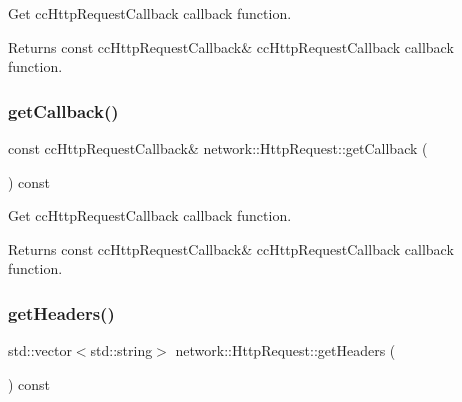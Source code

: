 Get cc\+Http\+Request\+Callback callback function.

\begin{DoxyReturn}{Returns}
const cc\+Http\+Request\+Callback\& cc\+Http\+Request\+Callback callback function. 
\end{DoxyReturn}
\mbox{\label{classnetwork_1_1HttpRequest_abc46429ca35e9585ddb0a96a744ecee2}} 
\subsubsection{\texorpdfstring{get\+Callback()}{getCallback()}\hspace{0.1cm}{\footnotesize\ttfamily [2/2]}}
{\footnotesize\ttfamily const cc\+Http\+Request\+Callback\& network\+::\+Http\+Request\+::get\+Callback (\begin{DoxyParamCaption}{ }\end{DoxyParamCaption}) const\hspace{0.3cm}{\ttfamily [inline]}}

Get cc\+Http\+Request\+Callback callback function.

\begin{DoxyReturn}{Returns}
const cc\+Http\+Request\+Callback\& cc\+Http\+Request\+Callback callback function. 
\end{DoxyReturn}
\mbox{\label{classnetwork_1_1HttpRequest_a3555ebc2bb79d38bf80a36ab9d979e6a}} 
\subsubsection{\texorpdfstring{get\+Headers()}{getHeaders()}\hspace{0.1cm}{\footnotesize\ttfamily [1/2]}}
{\footnotesize\ttfamily std\+::vector$<$std\+::string$>$ network\+::\+Http\+Request\+::get\+Headers (\begin{DoxyParamCaption}{ }\end{DoxyParamCaption}) const\hspace{0.3cm}{\ttfamily [inline]}}

